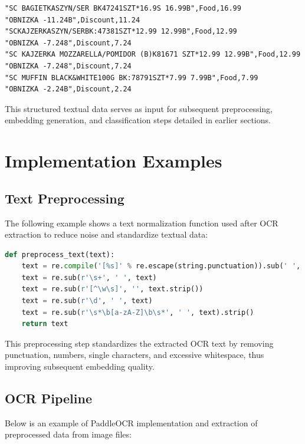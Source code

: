 \documentclass{SGGW-thesis-EN}
\begin{document}
\begin{verbatim}
"SC BAGIETKASZYN/SER BK47241SZT*16.9S 16.99B",Food,16.99
"OBNIZKA -11.24B",Discount,11.24
"SCKAJZERKASZYN/SERBK:47381SZT*12.99 12.99B",Food,12.99
"OBNIZKA -7.248",Discount,7.24
"SC KAJZERKA MOZZARELLA/POMIDOR (B)K81671 SZT*12.99 12.99B",Food,12.99
"OBNIZKA -7.248",Discount,7.24
"SC MUFFIN BLACK&WHITE100G BK:78791SZT*7.99 7.99B",Food,7.99
"OBNIZKA -2.24B",Discount,2.24
\end{verbatim}
\noindent This structured textual data serves as input for subsequent preprocessing, embedding generation, and classification steps detailed in earlier sections.


\section{Implementation Examples}

\subsection{Text Preprocessing}

The following example shows a text normalization function used after OCR extraction to reduce noise and standardize textual data:

\begin{lstlisting}[language=Python, caption={Post-OCR text preprocessing}, label={lst:preprocessing}]
def preprocess_text(text):
    text = re.compile('[%s]' % re.escape(string.punctuation)).sub(' ', text)
    text = re.sub(r'\s+', ' ', text)
    text = re.sub(r'[^\w\s]', '', text.strip())
    text = re.sub(r'\d', ' ', text)
    text = re.sub(r'\s*\b[a-zA-Z]\b\s*', ' ', text).strip()
    return text
\end{lstlisting}
\label{code:preprocessing_example}
\noindent This preprocessing step standardizes the extracted OCR text by removing punctuation, numbers, single characters, and excessive whitespace, thus improving subsequent embedding quality.

\subsection{OCR Pipeline}

Below is an example of PaddleOCR implementation and extraction of preprocessed data from image files:
\end{document}
